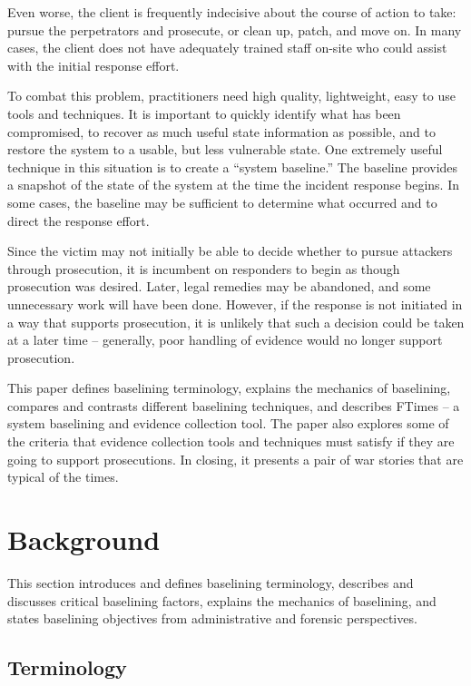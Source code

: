 \documentclass[10pt]{article}
\begin{document}
Even worse, the client is frequently indecisive about the course of
action to take: pursue the perpetrators and prosecute, or clean up,
patch, and move on.  In many cases, the client does not have
adequately trained staff on-site who could assist with the initial
response effort.

To combat this problem, practitioners need high quality, lightweight,
easy to use tools and techniques.  It is important to quickly identify
what has been compromised, to recover as much useful state information
as possible, and to restore the system to a usable, but less
vulnerable state.  One extremely useful technique in this situation is
to create a ``system baseline.'' The baseline provides a snapshot of
the state of the system at the time the incident response begins.  In
some cases, the baseline may be sufficient to determine what occurred
and to direct the response effort.

Since the victim may not initially be able to decide whether to pursue
attackers through prosecution, it is incumbent on responders to begin
as though prosecution was desired.  Later, legal remedies may be
abandoned, and some unnecessary work will have been done.  However, if
the response is not initiated in a way that supports prosecution, it
is unlikely that such a decision could be taken at a later time --
generally, poor handling of evidence would no longer support
prosecution.

This paper defines baselining terminology, explains the mechanics of
baselining, compares and contrasts different baselining techniques,
and describes FTimes -- a system baselining and evidence collection
tool.  The paper also explores some of the criteria that evidence
collection tools and techniques must satisfy if they are going to
support prosecutions.  In closing, it presents a pair of war stories
that are typical of the times.

\section{Background}

This section introduces and defines baselining terminology, describes
and discusses critical baselining factors, explains the mechanics of
baselining, and states baselining objectives from administrative and
forensic perspectives.

\subsection{Terminology}
\end{document}
